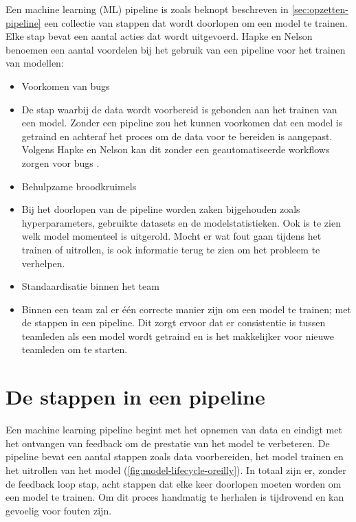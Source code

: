 
Een machine learning (ML) pipeline is zoals beknopt beschreven in \autoref{sec:opzetten-pipeline} een collectie van stappen dat wordt doorlopen om een model te trainen. Elke stap bevat een aantal acties dat wordt uitgevoerd. Hapke en Nelson \cite{building-machine-learning-pipelines-oreilly} benoemen een aantal voordelen bij het gebruik van een pipeline voor het trainen van modellen:

\begin{itemize}
  \item Voorkomen van bugs
  \item[] De stap waarbij de data wordt voorbereid is gebonden aan het trainen van een model. Zonder een pipeline zou het kunnen voorkomen dat een model is getraind en achteraf het proces om de data voor te bereiden is aangepast. Volgens Hapke en Nelson kan dit zonder een geautomatiseerde workflows zorgen voor bugs \cite[p.~2]{building-machine-learning-pipelines-oreilly}.
  \item Behulpzame broodkruimels
  \item[] Bij het doorlopen van de pipeline worden zaken bijgehouden zoals hyperparameters, gebruikte datasets en de modelstatistieken. Ook is te zien welk model momenteel is uitgerold. Mocht er wat fout gaan tijdens het trainen of uitrollen, is ook informatie terug te zien om het probleem te verhelpen.
  \item Standaardisatie binnen het team
  \item[] Binnen een team zal er één correcte manier zijn om een model te trainen; met de stappen in een pipeline. Dit zorgt ervoor dat er consistentie is tussen teamleden als een model wordt getraind en is het makkelijker voor nieuwe teamleden om te starten.
\end{itemize}

\section{De stappen in een pipeline}\label{sec:stappen-in-een-pipeline}
Een machine learning pipeline begint met het opnemen van data en eindigt met het ontvangen van feedback om de prestatie van het model te verbeteren. De pipeline bevat een aantal stappen zoals data voorbereiden, het model trainen en het uitrollen van het model (\autoref{fig:model-lifecycle-oreilly}). In totaal zijn er, zonder de feedback loop stap, acht stappen dat elke keer doorlopen moeten worden om een model te trainen. Om dit proces handmatig te herhalen is tijdrovend en kan gevoelig voor fouten zijn. 

